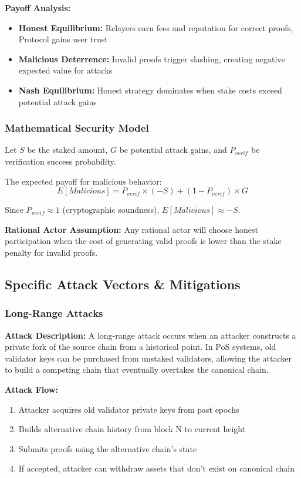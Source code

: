 \documentclass[11pt,a4paper]{article}
\begin{document}
\textbf{Payoff Analysis:}
\begin{itemize}
    \item \textbf{Honest Equilibrium:} Relayers earn fees and reputation for correct proofs, Protocol gains user trust
    \item \textbf{Malicious Deterrence:} Invalid proofs trigger slashing, creating negative expected value for attacks
    \item \textbf{Nash Equilibrium:} Honest strategy dominates when stake costs exceed potential attack gains
\end{itemize}

\subsubsection{Mathematical Security Model}
Let $S$ be the staked amount, $G$ be potential attack gains, and $P_{verif}$ be verification success probability.

The expected payoff for malicious behavior:
$$ E[Malicious] = P_{verif} \times (-S) + (1 - P_{verif}) \times G $$

Since $P_{verif} \approx 1$ (cryptographic soundness), $E[Malicious] \approx -S$.

\textbf{Rational Actor Assumption:} Any rational actor will choose honest participation when the cost of generating valid proofs is lower than the stake penalty for invalid proofs.

\subsection{Specific Attack Vectors \& Mitigations}

\subsubsection{Long-Range Attacks}

\textbf{Attack Description:}
A long-range attack occurs when an attacker constructs a private fork of the source chain from a historical point. In PoS systems, old validator keys can be purchased from unstaked validators, allowing the attacker to build a competing chain that eventually overtakes the canonical chain.

\textbf{Attack Flow:}
\begin{enumerate}
    \item Attacker acquires old validator private keys from past epochs
    \item Builds alternative chain history from block N to current height
    \item Submits proofs using the alternative chain's state
    \item If accepted, attacker can withdraw assets that don't exist on canonical chain
\end{enumerate}
\end{document}
